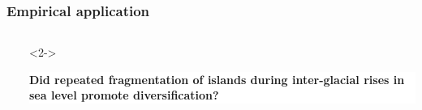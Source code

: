 

{
\begin{frame}
    \frametitle{Empirical application}    
    \begin{columns}

        \vspace{6.5cm}

        \ \\


        \vspace{-2cm}

        \begin{uncoverenv}<2->
        \colorbox{white}{
            \begin{minipage}[t]{1.0\textwidth}
                \raggedright
                \textbf{Did repeated fragmentation of islands during
                    inter-glacial rises in sea level promote diversification?}
            \end{minipage}
        }
        \end{uncoverenv}
    \end{columns}
\end{frame}
}

